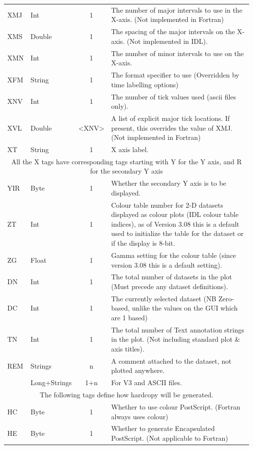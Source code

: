 \documentclass[english]{article}
\begin{document}
\begin{longtable}{|llcp{9cm}|}
  XMJ & Int & 1 & The number of major intervals to use in the
  X-axis. (Not implemented in Fortran)\\
  XMS & Double & 1 & The spacing of the major intervals on the
  X-axis. (Not implemented in IDL).\\
  XMN & Int & 1 & The number of minor intervals to use on the X-axis.\\
  XFM & String & 1 & The format specifier to use (Overridden by time
  labelling options) \\
  XNV & Int & 1 & The number of tick values used (ascii files only).\\
  XVL & Double & <XNV> & A list of explicit major tick locations. If
  present, this overrides the value of XMJ. (Not implemented in Fortran)\\
  XT& String& 1&
  X axis label.\\
  \hline \multicolumn{4}{|c|}{All the X tags have corresponding tags
    starting
    with Y for the Y axis, and R for the secondary Y axis}\\
  \hline
  YIR & Byte & 1 & Whether the secondary Y axis is to be displayed.\\
  \hline ZT& Int& 1& Colour table number for 2-D datasets displayed as
  colour plots (IDL colour table indices), as of Version 3.08 this is a
  default used to initialize the table for the dataset or if the
  display is 8-bit.\\
  ZG& Float& 1& Gamma setting for the colour table (since version 3.08
  this is a
  default setting).\\
  DN& Int& 1& The total number of datasets in the plot (Must precede
  any dataset
  definitions).\\
  DC& Int& 1& The currently selected dataset (NB Zero-based, unlike the
  values on
  the GUI which are 1 based)\\
  TN& Int& 1& The total number of Text annotation strings in the
  plot. (Not including
  standard plot \& axis titles).\\
  REM& Strings& n&
  A comment attached to the dataset, not plotted anywhere.\\
  & Long+Strings& 1+n&
  For V3 and ASCII files.\\
  \hline
  \multicolumn{4}{|c|}{The following tags define how hardcopy will be generated.}\\
  \hline HC& Byte& 1&
  Whether to use colour PostScript. (Fortran always uses colour)\\
  HE& Byte& 1&
  Whether to generate Encapsulated PostScript. (Not applicable to Fortran)\\

\end{longtable}
\end{document}
